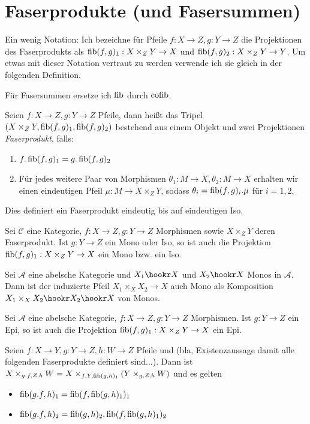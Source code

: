 \section{Faserprodukte (und Fasersummen)}

Ein wenig Notation: Ich bezeichne für Pfeile $f : X\to Z, g: Y\to Z$ die Projektionen des Faserprodukts als $\operatorname{fib}(f,g)_1 : X\times_Z Y \to X$ und $\operatorname{fib}(f,g)_2 : X\times_Z Y \to Y$. Um etwas mit dieser Notation vertraut zu werden verwende ich sie gleich in der folgenden Definition.

Für Fasersummen ersetze ich $\operatorname{fib}$ durch $\operatorname{cofib}$.

\begin{defn}
Seien $f:X\to Z, g:Y\to Z$ Pfeile, dann heißt das Tripel $(X\times_Z Y, \operatorname{fib}(f,g)_1, \operatorname{fib}(f,g)_2)$ bestehend aus einem Objekt und zwei Projektionen \emph{Faserprodukt}, falls:
\begin{enumerate}
\item $f.\operatorname{fib}(f,g)_1 = g.\operatorname{fib}(f,g)_2$
\item Für jedes weitere Paar von Morphismen $\theta_1 : M \to X, \theta_2 : M \to X$ erhalten wir einen eindeutigen Pfeil $\mu : M \to X\times_Z Y$, sodass $\theta_i = \operatorname{fib}(f,g)_i . \mu$ für $i=1,2$.
\end{enumerate}
Dies definiert ein Faserprodukt eindeutig bis auf eindeutigen Iso.
\end{defn}

\begin{prop} Sei $\mathcal C$ eine Kategorie, $f : X \to Z, g : Y\to Z$ Morphismen sowie $X\times_Z Y$ deren Faserprodukt. Ist $g: Y\to Z$ ein Mono oder Iso, so ist auch die Projektion $\operatorname{fib}(f,g)_1: X\times_Z Y \to X$ ein Mono bzw. ein Iso.
\end{prop}

\begin{korr}
Sei $\mathcal A$ eine abelsche Kategorie und
$X_1 \hookr X$ und $X_2 \hookr X$ Monos in $\mathcal A$. Dann ist der induzierte Pfeil $X_1 \times_X X_2 \to X$ auch Mono als Komposition $X_1\times_X X_2 \hookr X_2 \hookr X$ von Monos.
\end{korr}

\begin{prop} Sei $\mathcal A$ eine abelsche Kategorie, $f : X \to Z, g : Y\to Z$ Morphismen. Ist $g: Y\to Z$ ein Epi, so ist auch die Projektion $\operatorname{fib}(f,g)_1: X\times_Z Y \to X$ ein Epi.
\end{prop}

\begin{satz}[Staffelung]
Seien $f: X\to Y,g : Y\to Z,h:W\to Z$ Pfeile und (bla, Existenzaussage damit alle folgenden Faserprodukte definiert sind...). Dann ist $X\times_{g.f,Z,h} W = X\times_{f,Y,\operatorname{fib}(g,h)_1} (Y\times_{g,Z,h} W)$ und es gelten
\begin{itemize}
\item $\operatorname{fib}(g.f,h)_1 = \operatorname{fib}(f,\operatorname{fib}(g,h)_1)_1$
\item $\operatorname{fib}(g.f,h)_2 = \operatorname{fib}(g,h)_2 . \operatorname{fib}(f,\operatorname{fib}(g,h)_1)_2$
\end{itemize}
\end{satz}
